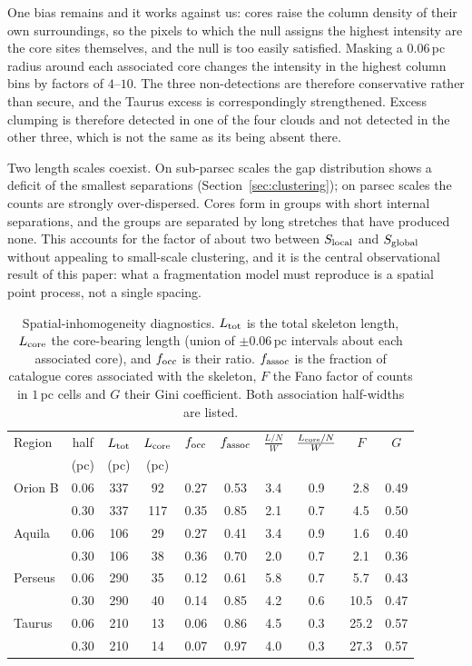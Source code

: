 \documentclass[usenatbib,twoside,twocolumn]{mnras}
\begin{document}
One bias remains and it works against us: cores raise the column density of their own surroundings, so the pixels to which the null assigns the highest intensity are the core sites themselves, and the null is too easily satisfied. Masking a $0.06$\,pc radius around each associated core changes the intensity in the highest column bins by factors of $4$--$10$. The three non-detections are therefore conservative rather than secure, and the Taurus excess is correspondingly strengthened. Excess clumping is therefore detected in one of the four clouds and not detected in the other three, which is not the same as its being absent there.

Two length scales coexist. On sub-parsec scales the gap distribution shows a deficit of the smallest separations (Section~\ref{sec:clustering}); on parsec scales the counts are strongly over-dispersed. Cores form in groups with short internal separations, and the groups are separated by long stretches that have produced none. This accounts for the factor of about two between $S_{\rm local}$ and $S_{\rm global}$ without appealing to small-scale clustering, and it is the central observational result of this paper: what a fragmentation model must reproduce is a spatial point process, not a single spacing.

\begin{table}
\caption{Spatial-inhomogeneity diagnostics. $L_{\rm tot}$ is the total skeleton length, $L_{\rm core}$ the core-bearing length (union of $\pm0.06$\,pc intervals about each associated core), and $f_{\rm occ}$ is their ratio. $f_{\rm assoc}$ is the fraction of catalogue cores associated with the skeleton, $F$ the Fano factor of counts in $1$\,pc cells and $G$ their Gini coefficient. Both association half-widths are listed. }
\label{tab:intermittency}
\footnotesize
\setlength{\tabcolsep}{3pt}
\begin{tabular}{lccccccccc}
\toprule
Region & half & $L_{\rm tot}$ & $L_{\rm core}$ & $f_{\rm occ}$ & $f_{\rm assoc}$ & $\frac{L/N}{W}$ & $\frac{L_{\rm core}/N}{W}$ & $F$ & $G$ \\
       & (pc) & (pc) & (pc) & & & & & & \\
\midrule
Orion B & 0.06 & 337 & 92 & 0.27 & 0.53 & 3.4 & 0.9 & 2.8 & 0.49 \\
        & 0.30 & 337 & 117 & 0.35 & 0.85 & 2.1 & 0.7 & 4.5 & 0.50 \\
Aquila  & 0.06 & 106 & 29 & 0.27 & 0.41 & 3.4 & 0.9 & 1.6 & 0.40 \\
        & 0.30 & 106 & 38 & 0.36 & 0.70 & 2.0 & 0.7 & 2.1 & 0.36 \\
Perseus & 0.06 & 290 & 35 & 0.12 & 0.61 & 5.8 & 0.7 & 5.7 & 0.43 \\
        & 0.30 & 290 & 40 & 0.14 & 0.85 & 4.2 & 0.6 & 10.5 & 0.47 \\
Taurus  & 0.06 & 210 & 13 & 0.06 & 0.86 & 4.5 & 0.3 & 25.2 & 0.57 \\
        & 0.30 & 210 & 14 & 0.07 & 0.97 & 4.0 & 0.3 & 27.3 & 0.57 \\
\bottomrule
\end{tabular}
\end{table}
\end{document}
